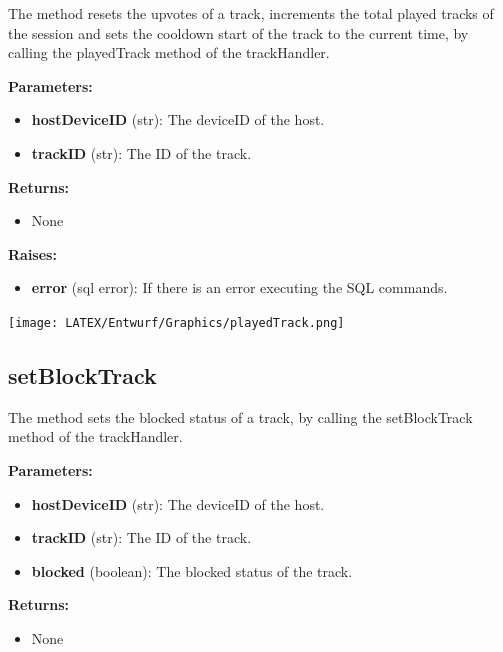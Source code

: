 \documentclass[oneside, ngerman]{sdqtechreport}
\begin{document}
The method resets the upvotes of a track, increments the total played tracks of the session and sets the cooldown start of the track to the current time, by calling the playedTrack method of the trackHandler.

\textbf{Parameters:}

\begin{itemize}
    \item \textbf{hostDeviceID} (str): The deviceID of the host.
    \item \textbf{trackID} (str): The ID of the track.
\end{itemize}

\textbf{Returns:}

\begin{itemize}
    \item None
\end{itemize}

\textbf{Raises:}

\begin{itemize}
    \item \textbf{error} (sql error): If there is an error executing the SQL commands.
\end{itemize}

\begin{center}
   \texttt{[image: LATEX/Entwurf/Graphics/playedTrack.png]} 
\end{center}



\subsection*{setBlockTrack}

The method sets the blocked status of a track, by calling the setBlockTrack method of the trackHandler.

\textbf{Parameters:}

\begin{itemize}
    \item \textbf{hostDeviceID} (str): The deviceID of the host.
    \item \textbf{trackID} (str): The ID of the track.
    \item \textbf{blocked} (boolean): The blocked status of the track.
\end{itemize}

\textbf{Returns:}

\begin{itemize}
    \item None
\end{itemize}
\end{document}
